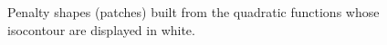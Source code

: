 \ifverylong
% 
% 
\begin{figure}
  \begin{center} 
    \caption{Penalty shapes (patches) built from the quadratic functions whose
             isocontour are displayed in white.}
    \label{fig:penalties}
    \end{center} 
\end{figure}
\fi



%  


